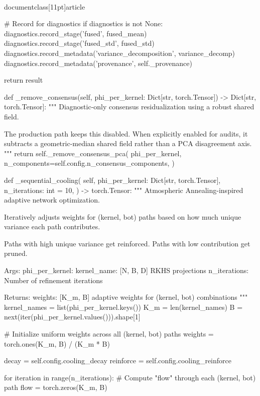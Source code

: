 \\documentclass[11pt]{article}
\begin{document}
\begin{CodeBlock}
{{{{        # Record for diagnostics
        if diagnostics is not None:
            diagnostics.record_stage('fused', fused_mean)
            diagnostics.record_stage('fused_std', fused_std)
            diagnostics.record_metadata('variance_decomposition', variance_decomp)
            diagnostics.record_metadata('provenance', self._provenance)
        
        return result
    
    def _remove_consensus(self, phi_per_kernel: Dict[str, torch.Tensor]) -> Dict[str, torch.Tensor]:
        """
        Diagnostic-only consensus residualization using a robust shared field.

        The production path keeps this disabled. When explicitly enabled for audits,
        it subtracts a geometric-median shared field rather than a PCA disagreement axis.
        """
        return self._remove_consensus_pca(
            phi_per_kernel,
            n_components=self.config.n_consensus_components,
        )
    
    def _sequential_cooling(
        self, 
        phi_per_kernel: Dict[str, torch.Tensor],
        n_iterations: int = 10,
    ) -> torch.Tensor:
        """
        Atmospheric Annealing-inspired adaptive network optimization.
        
        Iteratively adjusts weights for (kernel, bot) paths based on
        how much unique variance each path contributes.
        
        Paths with high unique variance get reinforced.
        Paths with low contribution get pruned.
        
        Args:
            phi_per_kernel: {kernel_name: [N, B, D]} RKHS projections
            n_iterations: Number of refinement iterations
            
        Returns:
            weights: [K_m, B] adaptive weights for (kernel, bot) combinations
        """
        kernel_names = list(phi_per_kernel.keys())
        K_m = len(kernel_names)
        B = next(iter(phi_per_kernel.values())).shape[1]
        
        # Initialize uniform weights across all (kernel, bot) paths
        weights = torch.ones(K_m, B) / (K_m * B)
        
        decay = self.config.cooling_decay
        reinforce = self.config.cooling_reinforce
        
        for iteration in range(n_iterations):
            # Compute "flow" through each (kernel, bot) path
            flow = torch.zeros(K_m, B)
            
}}}}
\end{CodeBlock}
\end{document}
